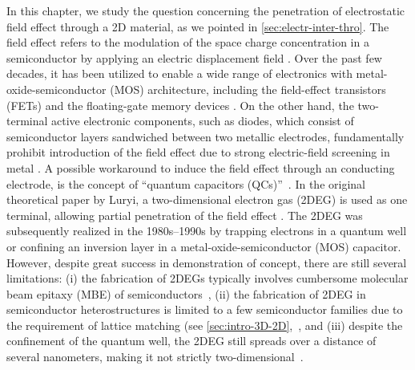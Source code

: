 In this chapter, we study the question concerning the penetration of
electrostatic field effect through a 2D material, as we pointed in
\autoref{sec:electr-inter-thro}.
%
The field effect refers to the modulation of the space charge
concentration in a semiconductor by applying an electric displacement
field \cite{Sze_2006_Mosfets}.  Over the past few decades, it has been
utilized to enable a wide range of electronics with
metal-oxide-semiconductor (MOS) architecture, including the
field-effect transistors (FETs) and the floating-gate memory devices
\cite{Sze_2006_Mosfets}.
%
On the other hand, the two-terminal active electronic components, such
as diodes, which consist of semiconductor layers sandwiched between
two metallic electrodes, fundamentally prohibit introduction of the
field effect due to strong electric-field screening in metal
\cite{Ehrenreich_2001_solidstate_phys}.
%
A possible workaround to induce the field effect through an conducting
electrode, is the concept of ``quantum capacitors
(QCs)''~\cite{Luryi_1988_Quantum}.  In the original theoretical paper
by Luryi, a two-dimensional electron gas (2DEG) is used as one
terminal, allowing partial penetration of the field effect
\cite{Luryi_1988_Quantum}.
%
The 2DEG was subsequently realized in the 1980s--1990s by trapping
electrons in a quantum well \cite{Davies_1997_book,Ihn_2009_book} or
confining an inversion layer in a metal-oxide-semiconductor (MOS)
capacitor\cite{Sze_2006_Mosfets}.
%
However, despite great success in demonstration of concept, there are
still several limitations: (i) the fabrication of 2DEGs typically
involves cumbersome molecular beam epitaxy (MBE) of
semiconductors~\cite{Chang_2012_MBE}, (ii) the fabrication of 2DEG in
semiconductor heterostructures is limited to a few semiconductor
families due to the requirement of lattice matching (see
\autoref{sec:intro-3D-2D},~\cite{Stormer_1979_2DEG}, and (iii) despite
the confinement of the quantum well, the 2DEG still spreads over a
distance of several nano\-meters, making it not strictly
two-dimensional~\cite{Ihn_2009_book}.
%

